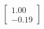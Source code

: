 \documentclass[preview]{standalone}
\begin{document}
\begin{align*}
\begin{bmatrix} 1.00 \\ -0.19 \end{bmatrix}
\end{align*}
\end{document}
